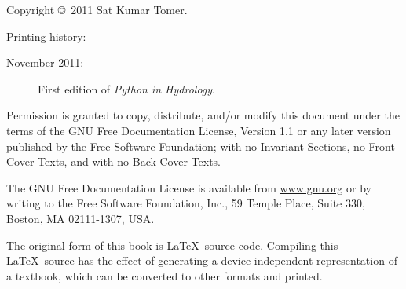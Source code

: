 \documentclass[10pt]{book}
\begin{document}
\begin{latexonly}
\begin{flushright}
\vspace{0.5in}

\vfill




\end{flushright}


\pagebreak
\thispagestyle{empty}

{\small
Copyright \copyright ~2011 Sat Kumar Tomer.


Printing history:

\begin{description}

\item[November 2011:] First edition of {\em Python in Hydrology}.



\end{description}

\vspace{0.2in}


Permission is granted to copy, distribute, and/or modify this document
under the terms of the GNU Free Documentation License, Version 1.1 or
any later version published by the Free Software Foundation; with no
Invariant Sections, no Front-Cover Texts, and with no Back-Cover Texts.

The GNU Free Documentation License is available from \url{www.gnu.org}
or by writing to the Free Software Foundation, Inc., 59 Temple Place,
Suite 330, Boston, MA 02111-1307, USA. 

The original form of this book is \LaTeX\ source code.  Compiling this
\LaTeX\ source has the effect of generating a device-independent
representation of a textbook, which can be converted to other formats
and printed.


\vspace{0.2in}

} %

\end{latexonly}
\end{document}
